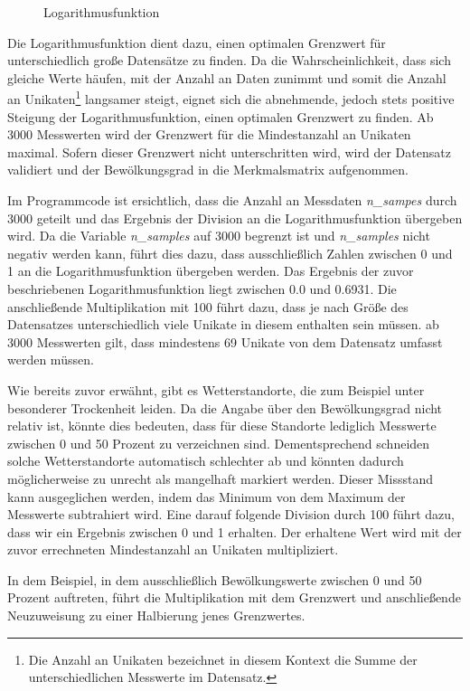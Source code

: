 \documentclass[12pt, a4paper]{article}
\begin{document}
\begin{figure}[h]
\centering
\def\svgwidth{425pt}

\caption{Logarithmusfunktion}
\label{fig:geogebra_cloudcover}
\end {figure}

Die Logarithmusfunktion dient dazu, einen optimalen Grenzwert für unterschiedlich große Datensätze zu finden. Da die Wahrscheinlichkeit, dass sich gleiche Werte häufen, mit der Anzahl an Daten zunimmt und somit die Anzahl an Unikaten\footnote{Die Anzahl an Unikaten bezeichnet in diesem Kontext die Summe der unterschiedlichen Messwerte im Datensatz.} langsamer steigt, eignet sich die abnehmende, jedoch stets positive Steigung der Logarithmusfunktion, einen optimalen Grenzwert zu finden. Ab 3000 Messwerten wird der Grenzwert für die Mindestanzahl an Unikaten maximal. Sofern dieser Grenzwert nicht unterschritten wird, wird der Datensatz validiert und der Bewölkungsgrad in die Merkmalsmatrix aufgenommen. 

Im Programmcode ist ersichtlich, dass die Anzahl an Messdaten \textit{n\_sampes} durch 3000 geteilt und das Ergebnis der Division an die Logarithmusfunktion übergeben wird. Da die Variable \textit{n\_samples} auf 3000 begrenzt ist und \textit{n\_samples} nicht negativ werden kann, führt dies dazu, dass ausschließlich Zahlen zwischen 0 und 1 an die Logarithmusfunktion übergeben werden. Das Ergebnis der zuvor beschriebenen Logarithmusfunktion liegt zwischen 0.0 und 0.6931. Die anschließende Multiplikation mit 100 führt dazu, dass je nach Größe des Datensatzes unterschiedlich viele Unikate in diesem enthalten sein müssen. ab 3000 Messwerten gilt, dass mindestens 69 Unikate von dem Datensatz umfasst werden müssen.

Wie bereits zuvor erwähnt, gibt es Wetterstandorte, die zum Beispiel unter besonderer Trockenheit leiden. Da die Angabe über den Bewölkungsgrad nicht relativ ist, könnte dies bedeuten, dass für diese Standorte lediglich Messwerte zwischen 0 und 50 Prozent zu verzeichnen sind. Dementsprechend schneiden solche Wetterstandorte automatisch schlechter ab und könnten dadurch möglicherweise zu unrecht als mangelhaft markiert werden. Dieser Missstand kann ausgeglichen werden, indem das Minimum von dem Maximum der Messwerte subtrahiert wird. Eine darauf folgende Division durch 100 führt dazu, dass wir ein Ergebnis zwischen 0 und 1 erhalten. Der erhaltene Wert wird mit der zuvor errechneten Mindestanzahl an Unikaten multipliziert. 

In dem Beispiel, in dem ausschließlich Bewölkungswerte zwischen 0 und 50 Prozent auftreten, führt die Multiplikation mit dem Grenzwert und anschließende Neuzuweisung zu einer Halbierung jenes Grenzwertes. 
\end{document}
